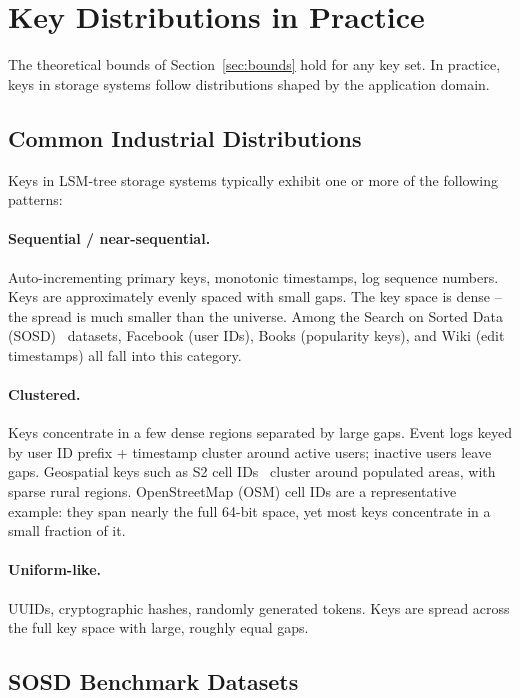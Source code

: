 \section{Key Distributions in Practice}
\label{sec:distributions}

The theoretical bounds of Section~\ref{sec:bounds} hold for any key set.
In practice, keys in storage systems follow distributions shaped
by the application domain.

\subsection{Common Industrial Distributions}
\label{subsec:common-industrial-distributions}

Keys in LSM-tree storage systems typically exhibit one or more of the following patterns:

\paragraph{Sequential / near-sequential.}
Auto-incrementing primary keys, monotonic timestamps, log sequence numbers. Keys are
approximately evenly spaced with small gaps.
The key space is dense – the spread is much smaller than the universe.
Among the Search on Sorted Data (SOSD)~\citep{kipf2019sosd} datasets, Facebook (user IDs), Books (popularity keys), and Wiki
(edit timestamps) all fall into this category.

\paragraph{Clustered.}
Keys concentrate in a few dense regions separated by large gaps.
Event logs keyed by user ID prefix + timestamp cluster around active users; inactive users leave gaps.
Geospatial keys such as S2 cell IDs~\citep{s2geometry} cluster around populated areas, with sparse rural regions.
OpenStreetMap (OSM) cell IDs are a representative example: they span nearly the full 64-bit space,
yet most keys concentrate in a small fraction of it.

\paragraph{Uniform-like.}
UUIDs, cryptographic hashes, randomly generated tokens.
Keys are spread across the full key space with large, roughly equal gaps.

\subsection{SOSD Benchmark Datasets}
\label{sec:sosd}

